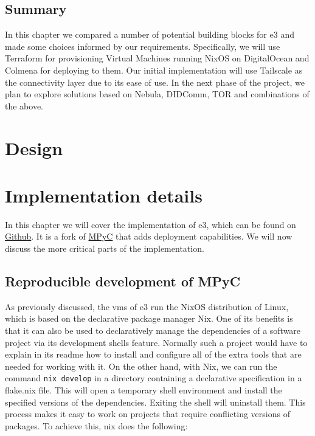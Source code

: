 \documentclass[
]{article}
\begin{document}
\hypertarget{summary}{%
  \subsection{Summary}\label{summary}}

In this chapter we compared a number of potential building blocks for
\gls{e3} and made some choices informed by our requirements.
Specifically, we will use Terraform for provisioning Virtual Machines
running NixOS on DigitalOcean and Colmena for deploying to them. Our
initial implementation will use Tailscale as the connectivity layer due
to its ease of use. In the next phase of the project, we plan to explore
solutions based on Nebula, DIDComm, TOR and combinations of the above.

\hypertarget{design}{%
  \section{Design}\label{design}}

\hypertarget{section}{%
  \subsection{}\label{section}}

\hypertarget{implementation-details}{%
  \section{Implementation details}\label{implementation-details}}

In this chapter we will cover the implementation of \gls{e3}, which can
be found on \href{https://github.com/e-nikolov/mpyc}{Github}. It is a
fork of \href{https://github.com/lschoe/mpyc}{MPyC} that adds deployment
capabilities. We will now discuss the more critical parts of the
implementation.

\hypertarget{reproducible-development-of-mpyc}{%
  \subsection{Reproducible development of
    MPyC}\label{reproducible-development-of-mpyc}}

As previously discussed, the \glspl{vm} of \gls{e3} run the NixOS
distribution of Linux, which is based on the declarative package manager
Nix. One of its benefits is that it can also be used to declaratively
manage the dependencies of a software project via its development shells
feature. Normally such a project would have to explain in its readme how
to install and configure all of the extra tools that are needed for
working with it. On the other hand, with Nix, we can run the command
\texttt{nix\ develop} in a directory containing a declarative
specification in a flake.nix file. This will open a temporary shell
environment and install the specified versions of the dependencies.
Exiting the shell will uninstall them. This process makes it easy to
work on projects that require conflicting versions of packages. To
achieve this, nix does the following:
\end{document}
